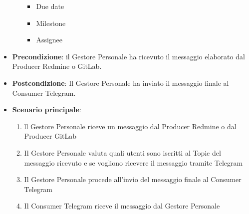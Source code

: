 \begin{itemize}
\begin{itemize}
\begin{itemize}
				\item Due date
				\item Milestone
				\item Assignee
			\end{itemize}
		\end{itemize}
		\item \textbf{Precondizione}: il Gestore Personale ha ricevuto il messaggio elaborato dal Producer Redmine o GitLab.
		\item \textbf{Postcondizione}: Il Gestore Personale ha inviato il messaggio finale al Consumer Telegram.
		\item \textbf{Scenario principale}:
		\begin{enumerate}
			\item ll Gestore Personale riceve un messaggio dal Producer Redmine o dal Producer GitLab
			\item Il Gestore Personale valuta quali utenti sono iscritti al Topic del messaggio ricevuto e se vogliono ricevere il messaggio tramite Telegram
			\item Il Gestore Personale procede all'invio del messaggio finale al Consumer Telegram
            \item Il Consumer Telegram riceve il messaggio dal Gestore Personale
		\end{enumerate}

	\end{itemize}

